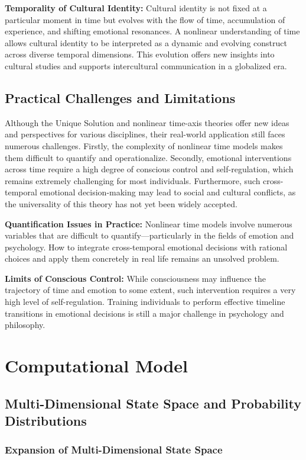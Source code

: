 \documentclass[12pt]{article}
\begin{document}
\textbf{Temporality of Cultural Identity:} Cultural identity is not fixed at a particular moment in time but evolves with the flow of time, accumulation of experience, and shifting emotional resonances. A nonlinear understanding of time allows cultural identity to be interpreted as a dynamic and evolving construct across diverse temporal dimensions. This evolution offers new insights into cultural studies and supports intercultural communication in a globalized era.
\subsection{Practical Challenges and Limitations}

Although the Unique Solution and nonlinear time-axis theories offer new ideas and perspectives for various disciplines, their real-world application still faces numerous challenges. Firstly, the complexity of nonlinear time models makes them difficult to quantify and operationalize. Secondly, emotional interventions across time require a high degree of conscious control and self-regulation, which remains extremely challenging for most individuals. Furthermore, such cross-temporal emotional decision-making may lead to social and cultural conflicts, as the universality of this theory has not yet been widely accepted.

\textbf{Quantification Issues in Practice:} Nonlinear time models involve numerous variables that are difficult to quantify—particularly in the fields of emotion and psychology. How to integrate cross-temporal emotional decisions with rational choices and apply them concretely in real life remains an unsolved problem.

\textbf{Limits of Conscious Control:} While consciousness may influence the trajectory of time and emotion to some extent, such intervention requires a very high level of self-regulation. Training individuals to perform effective timeline transitions in emotional decisions is still a major challenge in psychology and philosophy.
\section{Computational Model}

\subsection{Multi-Dimensional State Space and Probability Distributions}

\subsubsection{Expansion of Multi-Dimensional State Space}
\end{document}
